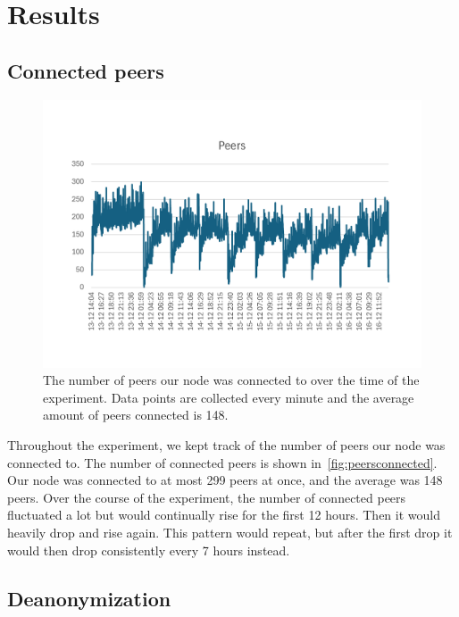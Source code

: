 \section{Results}\label{sec:results}

\subsection{Connected peers}\label{subsec:connected-peers}
\begin{figure}[!ht]
    \centering
    \includegraphics[scale = 0.5]{figures/conPeer2}
    \caption{The number of peers our node was connected to over the time of the experiment.
    Data points are collected every minute and the average amount of peers connected is 148.}
    \label{fig:peersconnected}
\end{figure}
Throughout the experiment, we kept track of the number of peers our node was connected to.
The number of connected peers is shown in~\autoref{fig:peersconnected}.
Our node was connected to at most 299 peers at once, and the average was 148 peers.
Over the course of the experiment, the number of connected peers fluctuated a lot but would continually rise for the first 12 hours.
Then it would heavily drop and rise again.
This pattern would repeat, but after the first drop it would then drop consistently every 7 hours instead.

\subsection{Deanonymization}\label{subsec:deanonymization}


